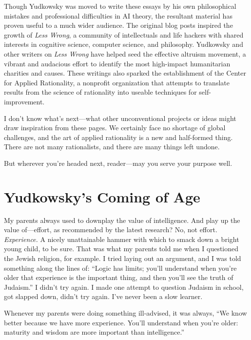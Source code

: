 {
 Though Yudkowsky was moved to write these essays by his own
philosophical mistakes and professional difficulties in AI theory, the
resultant material has proven useful to a much wider audience. The
original blog posts inspired the growth of \textit{Less Wrong}, a
community of intellectuals and life hackers with shared interests in
cognitive science, computer science, and philosophy. Yudkowsky and
other writers on \textit{Less Wrong} have helped seed the effective
altruism movement, a vibrant and audacious effort to identify the most
high-impact humanitarian charities and causes. These writings also
sparked the establishment of the Center for Applied Rationality, a
nonprofit organization that attempts to translate results from the
science of rationality into useable techniques for self-improvement.}

{
 I don't know what's next---what
other unconventional projects or ideas might draw inspiration from
these pages. We certainly face no shortage of global challenges, and
the art of applied rationality is a new and half-formed thing. There
are not many rationalists, and there are many things left undone.}

{
 But wherever you're headed next, reader---may you
serve your purpose well.}

\myendsectiontext

\chapter{Yudkowsky's Coming of Age}


{
 My parents always used to downplay the value of intelligence. And
play up the value of---effort, as recommended by the latest research?
No, not effort. \textit{Experience.} A nicely unattainable hammer with
which to smack down a bright young child, to be sure. That was what my
parents told me when I questioned the Jewish religion, for example. I
tried laying out an argument, and I was told something along the lines
of: ``Logic has limits; you'll
understand when you're older that experience is the
important thing, and then you'll see the truth of
Judaism.'' I didn't try again. I made
one attempt to question Judaism in school, got slapped down,
didn't try again. I've never been a
slow learner. }

{
 Whenever my parents were doing something ill-advised, it was
always, ``We know better because we have more
experience. You'll understand when
you're older: maturity and wisdom are more important
than intelligence.''}

